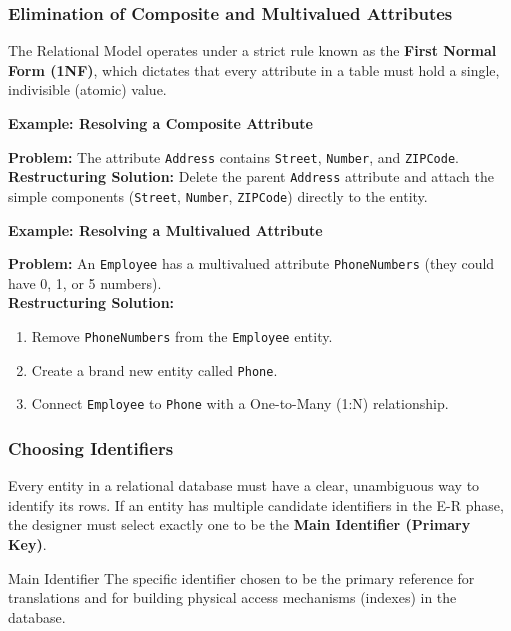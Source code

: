 \subsubsection{Elimination of Composite and Multivalued Attributes}
The Relational Model operates under a strict rule known as the \textbf{First Normal Form (1NF)}, which dictates that every attribute in a table must hold a single, indivisible (atomic) value. 

\vspace{0.2cm}
\begin{example}{\textbf{Example: Resolving a Composite Attribute}}

\textbf{Problem:} The attribute \texttt{Address} contains \texttt{Street}, \texttt{Number}, and \texttt{ZIPCode}.\\
\textbf{Restructuring Solution:} Delete the parent \texttt{Address} attribute and attach the simple components (\texttt{Street}, \texttt{Number}, \texttt{ZIPCode}) directly to the entity.
\end{example}

\vspace{0.2cm}
\begin{example}{\textbf{Example: Resolving a Multivalued Attribute}}

\textbf{Problem:} An \texttt{Employee} has a multivalued attribute \texttt{PhoneNumbers} (they could have 0, 1, or 5 numbers).\\
\textbf{Restructuring Solution:} 
\begin{enumerate}
    \item Remove \texttt{PhoneNumbers} from the \texttt{Employee} entity.
    \item Create a brand new entity called \texttt{Phone}.
    \item Connect \texttt{Employee} to \texttt{Phone} with a One-to-Many (1:N) relationship.
\end{enumerate}
\end{example}

\subsubsection{Choosing Identifiers}
Every entity in a relational database must have a clear, unambiguous way to identify its rows. If an entity has multiple candidate identifiers in the E-R phase, the designer must select exactly one to be the \textbf{Main Identifier (Primary Key)}.

\begin{defbox}{Main Identifier}
The specific identifier chosen to be the primary reference for translations and for building physical access mechanisms (indexes) in the database.
\end{defbox}


